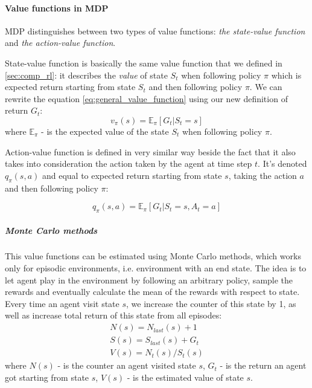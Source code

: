 \paragraph{Value functions in MDP} MDP distinguishes between two types of value functions:
\emph{the state-value function} and \emph{the action-value function}.

State-value function is basically the same value function that we defined in \autoref{sec:comp_rl}:
it describes the \emph{value} of state $S_t$ when following policy $\pi$ which is expected return
starting from state $S_t$ and then following policy $\pi$. We can rewrite the equation \ref{eq:general_value_function}
using our new definition of return $G_t$:
\begin{equation} \label{eq:value_state}
	v_{\pi}(s) = \mathbb{E}_{\pi} [G_t |S_t = s]
\end{equation}
where $\mathbb{E}_{\pi}$ - is the expected value of the state $S_t$ when
following policy $\pi$.

Action-value function is defined in very similar way beside the fact that it also takes
into consideration the action taken by the agent at time step $t$. It's denoted $q_{\pi}(s, a)$
and equal to expected return starting from state $s$, taking the action $a$ and then following
policy $\pi$:

\begin{equation} \label{eq:action_value_func}
	q_{\pi}(s, a) = \mathbb{E}_{\pi} [G_t |S_t = s, A_t = a]
\end{equation}

\subparagraph{Monte Carlo methods}

This value functions can be estimated using Monte Carlo methods, which works
only for episodic environments, i.e. environment with an end state.
The idea is to let agent play in the environment by following an arbitrary policy,
sample the rewards and eventually calculate the mean of the rewards with respect to state.
Every time an agent visit state $s$, we increase the counter
of this state by 1, as well as increase total return of this state from all episodes:
\begin{align}
	N(s) = N_{last}(s) + 1 \\
	S(s) = S_{last}(s) + G_t\\
	V(s) = N_t(s) / S_t(s)
\end{align}
where $N(s)$ - is the counter an agent visited state $s$,
$G_t$ - is the return an agent got starting from state $s$,
$V(s)$ - is the estimated value of state $s$.

